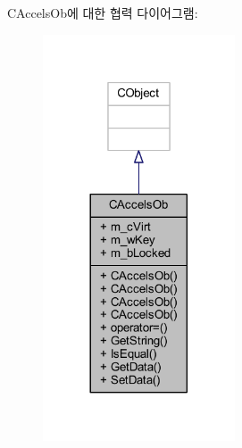 C\+Accels\+Ob에 대한 협력 다이어그램\+:\nopagebreak
\begin{figure}[H]
\begin{center}
\leavevmode
\includegraphics[width=161pt]{class_c_accels_ob__coll__graph}
\end{center}
\end{figure}
